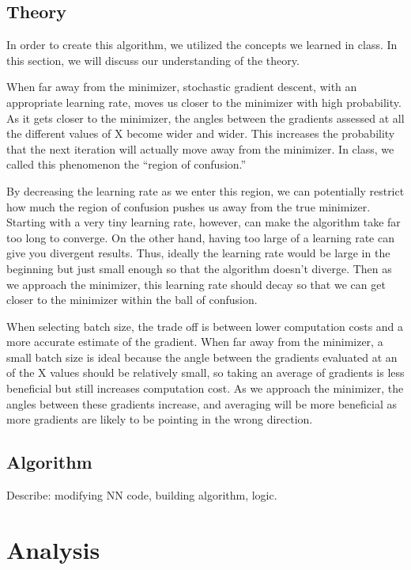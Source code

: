 \documentclass{article}
\begin{document}
\subsection{Theory}
\par In order to create this algorithm, we utilized the concepts we learned in class. In this section, we will discuss our understanding of the theory. 
\par When far away from the minimizer, stochastic gradient descent, with an appropriate learning rate, moves us closer to the minimizer with high probability. As it gets closer to the minimizer, the angles between the gradients assessed at all the different values of X become wider and wider. This increases the probability that the next iteration will actually move away from the minimizer. In class, we called this phenomenon the ``region of confusion.''
\par By decreasing the learning rate as we enter this region, we can potentially restrict how much the region of confusion pushes us away from the true minimizer. Starting with a very tiny learning rate, however, can make the algorithm take far too long to converge. On the other hand, having too large of a learning rate can give you divergent results. Thus, ideally the learning rate would be large in the beginning but just small enough so that the algorithm doesn't diverge. Then as we approach the minimizer, this learning rate should decay so that we can get closer to the minimizer within the ball of confusion. 
\par When selecting batch size, the trade off is between lower computation costs and a more accurate estimate of the gradient. When far away from the minimizer, a small batch size is ideal because the angle between the gradients evaluated at an of the X values should be relatively small, so taking an average of gradients is less beneficial but still increases computation cost. As we approach the minimizer, the angles between these gradients increase, and averaging will be more beneficial as more gradients are likely to be pointing in the wrong direction. 

\subsection{Algorithm}
Describe: modifying NN code, building algorithm, logic. 

\section{Analysis}
\end{document}
